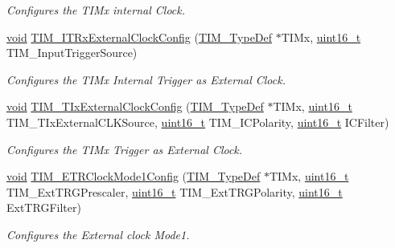 \begin{DoxyCompactItemize}
\begin{DoxyCompactList}\small\item\em Configures the T\+I\+Mx internal Clock. \end{DoxyCompactList}\item 
\hyperlink{usb__devapi_8h_afabf60e7f57651d6d595a02c75f07cd0}{void} \hyperlink{group___t_i_m___private___functions_gabef227d21d9e121e6a4ec5ab6223f5a9}{T\+I\+M\+\_\+\+I\+T\+Rx\+External\+Clock\+Config} (\hyperlink{struct_t_i_m___type_def}{T\+I\+M\+\_\+\+Type\+Def} $\ast$T\+I\+Mx, \hyperlink{_p_e___types_8h_a1f1825b69244eb3ad2c7165ddc99c956}{uint16\+\_\+t} T\+I\+M\+\_\+\+Input\+Trigger\+Source)
\begin{DoxyCompactList}\small\item\em Configures the T\+I\+Mx Internal Trigger as External Clock. \end{DoxyCompactList}\item 
\hyperlink{usb__devapi_8h_afabf60e7f57651d6d595a02c75f07cd0}{void} \hyperlink{group___t_i_m___private___functions_gaf460e7d9c9969044e364130e209937fc}{T\+I\+M\+\_\+\+T\+Ix\+External\+Clock\+Config} (\hyperlink{struct_t_i_m___type_def}{T\+I\+M\+\_\+\+Type\+Def} $\ast$T\+I\+Mx, \hyperlink{_p_e___types_8h_a1f1825b69244eb3ad2c7165ddc99c956}{uint16\+\_\+t} T\+I\+M\+\_\+\+T\+Ix\+External\+C\+L\+K\+Source, \hyperlink{_p_e___types_8h_a1f1825b69244eb3ad2c7165ddc99c956}{uint16\+\_\+t} T\+I\+M\+\_\+\+I\+C\+Polarity, \hyperlink{_p_e___types_8h_a1f1825b69244eb3ad2c7165ddc99c956}{uint16\+\_\+t} I\+C\+Filter)
\begin{DoxyCompactList}\small\item\em Configures the T\+I\+Mx Trigger as External Clock. \end{DoxyCompactList}\item 
\hyperlink{usb__devapi_8h_afabf60e7f57651d6d595a02c75f07cd0}{void} \hyperlink{group___t_i_m___private___functions_ga47c05638b93aabcd641dbc8859e1b2df}{T\+I\+M\+\_\+\+E\+T\+R\+Clock\+Mode1\+Config} (\hyperlink{struct_t_i_m___type_def}{T\+I\+M\+\_\+\+Type\+Def} $\ast$T\+I\+Mx, \hyperlink{_p_e___types_8h_a1f1825b69244eb3ad2c7165ddc99c956}{uint16\+\_\+t} T\+I\+M\+\_\+\+Ext\+T\+R\+G\+Prescaler, \hyperlink{_p_e___types_8h_a1f1825b69244eb3ad2c7165ddc99c956}{uint16\+\_\+t} T\+I\+M\+\_\+\+Ext\+T\+R\+G\+Polarity, \hyperlink{_p_e___types_8h_a1f1825b69244eb3ad2c7165ddc99c956}{uint16\+\_\+t} Ext\+T\+R\+G\+Filter)
\begin{DoxyCompactList}\small\item\em Configures the External clock Mode1. \end{DoxyCompactList}\item 

\end{DoxyCompactItemize}
